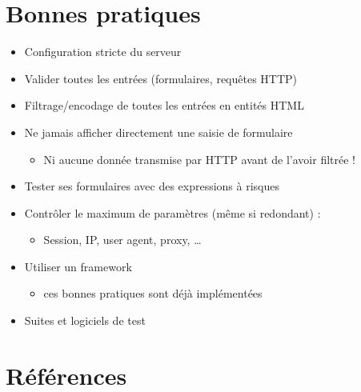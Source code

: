\hypertarget{bonnes-pratiques}{%
\section{Bonnes pratiques}\label{bonnes-pratiques}}

\begin{itemize}
\tightlist
\item
  Configuration stricte du serveur
\item
  Valider toutes les entrées (formulaires, requêtes HTTP)
\item
  Filtrage/encodage de toutes les entrées en entités HTML
\item
  Ne jamais afficher directement une saisie de formulaire

  \begin{itemize}
  \tightlist
  \item
    Ni aucune donnée transmise par HTTP avant de l'avoir filtrée !
  \end{itemize}
\item
  Tester ses formulaires avec des expressions à risques
\item
  Contrôler le maximum de paramètres (même si redondant) :

  \begin{itemize}
  \tightlist
  \item
    Session, IP, user agent, proxy, \ldots{}
  \end{itemize}
\item
  Utiliser un framework

  \begin{itemize}
  \tightlist
  \item
    ces bonnes pratiques sont déjà implémentées
  \end{itemize}
\item
  Suites et logiciels de test
\end{itemize}

\hypertarget{ruxe9fuxe9rences}{%
\section{Références}\label{ruxe9fuxe9rences}}


